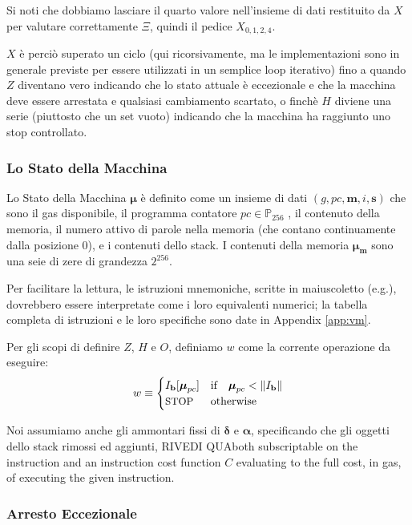 \documentclass[9pt,oneside]{amsart}
\makeatletter
\newcommand*\eg{e.g.\@\xspace}
\makeatother
\begin{document}
\begin{multicols}{2}
Si noti che dobbiamo lasciare il quarto valore nell'insieme di dati restituito da $X$ per valutare correttamente $\Xi$, quindi il pedice $X_{0,1,2,4}$.

$X$ è perciò superato un ciclo (qui ricorsivamente, ma le implementazioni sono in generale previste per essere utilizzati in un semplice loop iterativo) fino a quando $Z$ diventano vero indicando che lo stato attuale è eccezionale e che la macchina deve essere arrestata e qualsiasi cambiamento scartato, o finchè $H$ diviene una serie (piuttosto che un set vuoto) indicando che la macchina ha raggiunto uno stop controllato.

\subsubsection{Lo Stato della Macchina}
Lo Stato della Macchina $\boldsymbol{\mu}$ è definito come un insieme di dati $(g, pc, \mathbf{m}, i, \mathbf{s})$ che sono il gas disponibile, il programma contatore $pc \in \mathbb{P}_{256}$ , il contenuto della memoria, il numero attivo di parole nella memoria (che contano continuamente dalla posizione 0), e i contenuti dello stack. I contenuti della memoria $\boldsymbol{\mu}_\mathbf{m}$ sono una seie di zere di grandezza $2^{256}$.

Per facilitare la lettura, le istruzioni mnemoniche, scritte in maiuscoletto (\eg {}), dovrebbero essere interpretate come i loro equivalenti numerici; la tabella completa di istruzioni e le loro specifiche sono date in Appendix \ref{app:vm}.

Per gli scopi di definire $Z$, $H$ e $O$, definiamo $w$ come la corrente operazione da eseguire:
\begin{equation}\label{eq:currentoperation}
w \equiv \begin{cases} I_\mathbf{b}[\boldsymbol{\mu}_{pc}] & \text{if} \quad \boldsymbol{\mu}_{pc} < \lVert I_\mathbf{b} \rVert \\
\text{\small STOP} & \text{otherwise}
\end{cases}
\end{equation}

Noi assumiamo anche gli ammontari fissi di $\mathbf{\delta}$ e $\mathbf{\alpha}$, specificando che gli oggetti dello stack rimossi ed aggiunti, RIVEDI QUAboth subscriptable on the instruction and an instruction cost function $C$ evaluating to the full cost, in gas, of executing the given instruction.

\subsubsection{Arresto Eccezionale}


\end{multicols}
\end{document}

